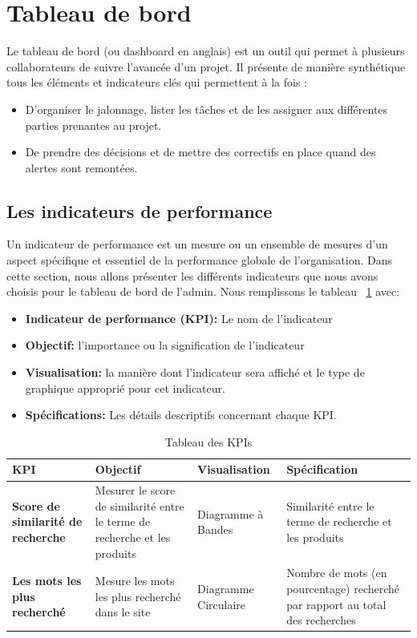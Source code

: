 \section{Tableau de bord}
\noindent
Le tableau de bord (ou dashboard en anglais) est un outil qui permet à plusieurs collaborateurs de suivre l’avancée d’un projet. Il présente de manière synthétique tous les éléments et indicateurs clés qui permettent à la fois :
\begin{itemize}
	\item D’organiser le jalonnage, lister les tâches et de les assigner aux différentes parties prenantes au projet.
	\item De prendre des décisions et de mettre des correctifs en place quand des alertes sont remontées.
\end{itemize}


\subsection{Les indicateurs de performance}
\noindent
Un indicateur de performance est un mesure ou un ensemble de mesures d'un aspect spécifique et essentiel de la performance globale de l'organisation.
Dans cette section, nous allons présenter les différents indicateurs que nous avons choisis pour le tableau de bord de l'admin. Nous remplissons le tableau ~\ref{tab:kpi} avec:
\begin{itemize}
	\item \large\textbf{Indicateur de performance (KPI):} Le nom de l'indicateur
	\item \large\textbf{Objectif:} l'importance ou la signification de l'indicateur
	\item \large\textbf{Visualisation:} la manière dont l'indicateur sera affiché et le type de graphique approprié pour cet indicateur.
	\item \large\textbf{Spécifications:} Les détails descriptifs concernant chaque KPI.
\end{itemize}

\newpage
\begin{table}[H]
    \centering
    \renewcommand{\arraystretch}{1.5}
    \begin{tabular}{|>{\bfseries}m{4cm}|m{4cm}|m{4cm}|m{4cm}|}
        \hline
        \rowcolor{blue!50}
        \textbf{KPI} & \textbf{Objectif} & \textbf{Visualisation} & \textbf{Spécification} \\
        \hline
        Score de similarité de recherche & Mesurer le score de similarité entre le terme de recherche et les produits & Diagramme à Bandes & Similarité entre le terme de recherche et les produits  \\
        \hline
        Les mots les plus recherché & Mesure les mots les plus recherché dans le site  & Diagramme Circulaire & Nombre de mots (en pourcentage) recherché par rapport au total des recherches \\
        \hline
    \end{tabular}
    \caption{Tableau des KPIs}
    \label{tab:kpi}
\end{table}


